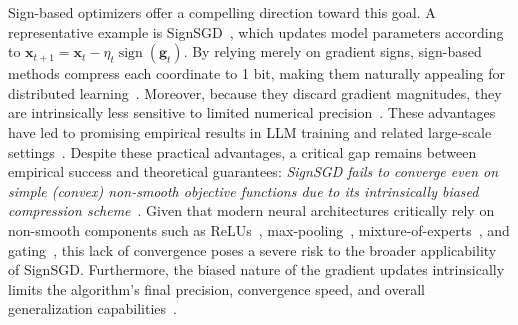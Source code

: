 \documentclass{article}
\def \x {\mathbf{x}}
\def \g {\mathbf{g}}
\DeclareMathOperator*{\sgn}{sign}
\newcommand{\sign}[1]{\sgn\left(#1\right)}
\begin{document}
Sign-based optimizers offer a compelling direction toward this goal. A representative example is SignSGD~\citep{bernstein2018signsgd}, which updates model parameters according to
$\x_{t+1}=\x_t-\eta_t\sign{\g_t}$. By relying merely on gradient signs, sign-based methods compress each coordinate to 1 bit, making them naturally appealing for distributed learning~\citep{bernstein2019signsgd,liu2024dlion}. Moreover, because they discard gradient magnitudes, they are intrinsically less sensitive to limited numerical precision~\citep{li2023qft}. These advantages have led to promising empirical results in LLM training and related large-scale settings~\citep{chen2023symbolic,zhaoICLR2025deconstructing,yuan25mars,narayan2025fp8unit,schlotthauer2025pre,semenov2025benchmarking}. Despite these practical advantages, a critical gap remains between empirical success and theoretical guarantees: \emph{SignSGD fails to converge even on simple (convex) non-smooth objective functions due to its intrinsically biased compression scheme}~\citep{karimireddy2019error}. Given that modern neural architectures critically rely on non-smooth components such as ReLUs~\citep{nair2010relu}, max-pooling~\citep{goodfellow2016deep}, mixture-of-experts~\citep{shazeer2017moe}, and gating~\citep{JMLR2022switchtransformer}, this lack of convergence poses a severe risk to the broader applicability of SignSGD. Furthermore, the biased nature of the gradient updates intrinsically limits the algorithm's final precision, convergence speed, and overall generalization capabilities~\citep{karimireddy2019error,ajalloeian2020bias,pan2025unbiased}.
\end{document}
